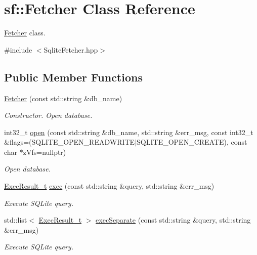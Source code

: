 \hypertarget{classsf_1_1Fetcher}{}\section{sf\+:\+:Fetcher Class Reference}
\label{classsf_1_1Fetcher}


\hyperlink{classsf_1_1Fetcher}{Fetcher} class.  




{\ttfamily \#include $<$Sqlite\+Fetcher.\+hpp$>$}

\subsection*{Public Member Functions}
\begin{DoxyCompactItemize}
\item 
\hyperlink{classsf_1_1Fetcher_a60f501e4abd57b30c206b45290a33661}{Fetcher} (const std\+::string \&db\+\_\+name)
\begin{DoxyCompactList}\small\item\em Constructor. Open database. \end{DoxyCompactList}\item 
int32\+\_\+t \hyperlink{classsf_1_1Fetcher_a14e850e1534d18235fab3b43de549b3b}{open} (const std\+::string \&db\+\_\+name, std\+::string \&err\+\_\+msg, const int32\+\_\+t \&flags=(S\+Q\+L\+I\+T\+E\+\_\+\+O\+P\+E\+N\+\_\+\+R\+E\+A\+D\+W\+R\+I\+TE$\vert$S\+Q\+L\+I\+T\+E\+\_\+\+O\+P\+E\+N\+\_\+\+C\+R\+E\+A\+TE), const char $\ast$z\+Vfs=nullptr)
\begin{DoxyCompactList}\small\item\em Open database. \end{DoxyCompactList}\item 
\hyperlink{structsf_1_1ExecResult__t}{Exec\+Result\+\_\+t} \hyperlink{classsf_1_1Fetcher_a1f89a1897ae6f8f4aaf66e4a81a2ac23}{exec} (const std\+::string \&query, std\+::string \&err\+\_\+msg)
\begin{DoxyCompactList}\small\item\em Execute S\+Q\+Lite query. \end{DoxyCompactList}\item 
std\+::list$<$ \hyperlink{structsf_1_1ExecResult__t}{Exec\+Result\+\_\+t} $>$ \hyperlink{classsf_1_1Fetcher_ad10c6cd3ced7f0b6ad21960fe09a28ca}{exec\+Separate} (const std\+::string \&query, std\+::string \&err\+\_\+msg)
\begin{DoxyCompactList}\small\item\em Execute S\+Q\+Lite query. \end{DoxyCompactList}\item 

\end{DoxyCompactItemize}
